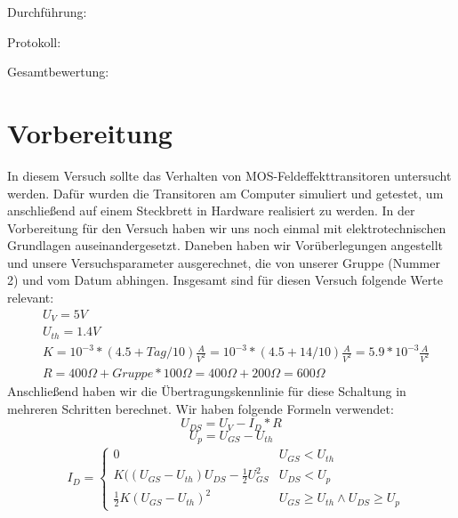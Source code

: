 \documentclass[12pt,a4paper]{scrartcl}
\begin{document}
Durchf\"uhrung:

Protokoll:

Gesamtbewertung:
\clearpage



\section{Vorbereitung}
In diesem Versuch sollte das Verhalten von MOS-Feldeffekttransitoren untersucht werden.
Daf\"ur wurden die Transitoren am Computer simuliert und getestet, um anschlie\ss end auf einem Steckbrett in Hardware realisiert zu werden.
In der Vorbereitung für den Versuch haben wir uns noch einmal mit elektrotechnischen Grundlagen auseinandergesetzt.
Daneben haben wir Vor\"uberlegungen angestellt und unsere Versuchsparameter ausgerechnet, die von unserer Gruppe (Nummer 2) und vom Datum abhingen.
Insgesamt sind f\"ur diesen Versuch folgende Werte relevant:
\begin{align} \label{eq:geg}
&U_V = 5V \nonumber \\
&U_{th} = 1.4V \nonumber \\
&K = 10^{-3}*(4.5 + Tag/10) \frac{A}{V^2} = 10^{-3}*(4.5 + 14/10) \frac{A}{V^2} = 5.9*10^{-3} \frac{A}{V^2} \nonumber \\
&R = 400\Omega + Gruppe*100\Omega = 400\Omega + 200\Omega = 600 \Omega
\end{align}
Anschlie\ss end haben wir die \"Ubertragungskennlinie f\"ur diese Schaltung in mehreren Schritten berechnet.
Wir haben folgende Formeln verwendet:
\begin{equation} \label{eq:UDS}
U_{DS} = U_V - I_D * R
\end{equation}
\begin{equation} \label{eq:Up}
U_p = U_{GS} - U_{th}
\end{equation}
\begin{align} \label{eq:ID}
&I_D = \left\{
  \begin{array}{lr}
    0  & U_{GS} < U_{th}\\
    K((U_{GS} - U_{th})U_{DS} - \frac{1}{2}U_{GS}^2 & U_{DS} < U_p\\
    \frac{1}{2}K(U_{GS} - U_{th})^2 & U_{GS} \geq U_{th} \wedge U_{DS} \geq U_p
  \end{array}
\right.
\end{align}
\end{document}
